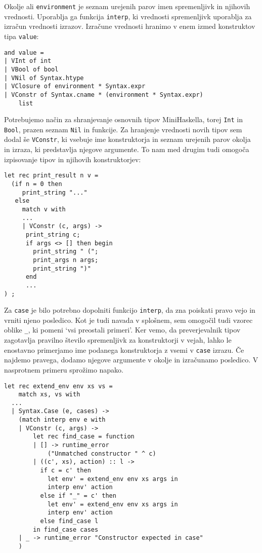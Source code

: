 \documentclass[12pt,a4paper,openany]{book}
\begin{document}
Okolje ali \lstinline{environment} je seznam urejenih parov imen spremenljivk in njihovih vrednosti. Uporablja ga funkcija \lstinline{interp}, ki vrednosti spremenljivk uporablja za izračun 
vrednosti izrazov. Izračune vrednosti hranimo v enem izmed konstruktov tipa \lstinline{value}: 
\begin{lstlisting}
and value =
| VInt of int
| VBool of bool
| VNil of Syntax.htype
| VClosure of environment * Syntax.expr
| VConstr of Syntax.cname * (environment * Syntax.expr) 
    list
\end{lstlisting}
Potrebujemo način za shranjevanje osnovnih tipov MiniHaskella, torej \lstinline{Int} in \lstinline{Bool}, prazen seznam \lstinline{Nil} in funkcije. Za hranjenje vrednosti novih tipov sem dodal še 
\lstinline{VConstr}, ki vsebuje ime konstruktorja in seznam urejenih parov okolja in izraza, ki predstavlja njegove argumente. To nam med drugim tudi omogoča izpisovanje tipov in njihovih 
konstruktorjev:
\begin{lstlisting}
let rec print_result n v =
  (if n = 0 then
     print_string "..."
   else
     match v with
     ...
     | VConstr (c, args) ->
      print_string c;
      if args <> [] then begin
        print_string " (";
        print_args n args;
        print_string ")"
      end
      ...
) ;
\end{lstlisting}

Za \lstinline{case} je bilo potrebno dopolniti funkcijo \lstinline{interp}, da zna poiskati pravo vejo in vrniti njeno posledico. Kot je tudi navada v splošnem, sem omogočil tudi vzorec oblike \lstinline{_}, ki 
pomeni `vsi preostali primeri'. Ker vemo, da preverjevalnik tipov zagotavlja pravilno število spremenljivk za konstruktorji v vejah, lahko le enostavno primerjamo ime podanega 
konstruktorja z vsemi v \lstinline{case} izrazu. Če najdemo pravega, dodamo njegove argumente v okolje in izračunamo posledico. V nasprotnem primeru sprožimo napako. 
\begin{lstlisting}
let rec extend_env env xs vs =
    match xs, vs with
  ...
  | Syntax.Case (e, cases) ->
    (match interp env e with
    | VConstr (c, args) ->
        let rec find_case = function
        | [] -> runtime_error 
            ("Unmatched constructor " ^ c)
        | ((c', xs), action) :: l ->
          if c = c' then
            let env' = extend_env env xs args in
            interp env' action
          else if "_" = c' then
            let env' = extend_env env xs args in
            interp env' action
          else find_case l
        in find_case cases
    | _ -> runtime_error "Constructor expected in case"
    )
\end{lstlisting}
\end{document}
